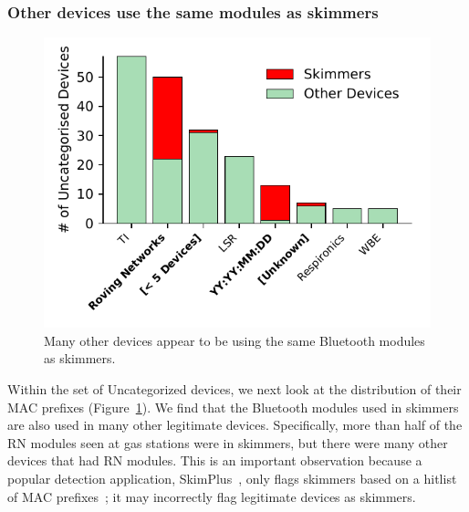\subsubsection*{Other devices use the same modules as skimmers} %


\begin{figure}
\centering
\includegraphics[width=0.6\linewidth]{skimmer/plots/uncat_hist_device_OUI.pdf}
\caption{
\label{fig:hist_device_OUI}
Many other devices appear to be using the same Bluetooth modules as skimmers.
}
\end{figure}

Within the set of Uncategorized devices, we next look at the distribution of
their MAC prefixes (Figure~\ref{fig:hist_device_OUI}).
%
%
We find that the Bluetooth modules used in skimmers are also used in many other legitimate
devices.
%
Specifically, more than half of the RN modules seen at gas stations were in
skimmers, but there were many other devices that had RN modules.
%
%
%
This is an important observation because a popular detection application,
SkimPlus~\cite{skimplus}, only flags skimmers based on a hitlist of MAC
prefixes~\cite{scaifeoakland}; it may incorrectly flag legitimate devices as
skimmers.

